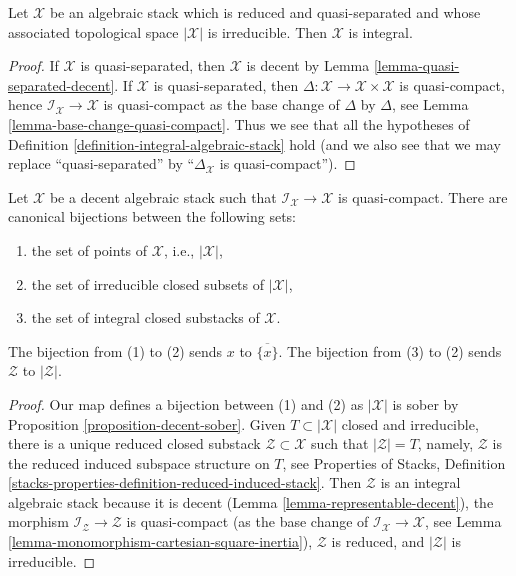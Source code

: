 \begin{lemma}
\label{lemma-totaro-case}
Let $\mathcal{X}$ be an algebraic stack which is reduced and quasi-separated
and whose associated topological space $|\mathcal{X}|$ is irreducible.
Then $\mathcal{X}$ is integral.
\end{lemma}

\begin{proof}
If $\mathcal{X}$ is quasi-separated, then $\mathcal{X}$ is decent
by Lemma \ref{lemma-quasi-separated-decent}.
If $\mathcal{X}$ is quasi-separated, then
$\Delta : \mathcal{X} \to \mathcal{X} \times \mathcal{X}$ is quasi-compact,
hence $\mathcal{I}_\mathcal{X} \to \mathcal{X}$ is quasi-compact
as the base change of $\Delta$ by $\Delta$, see
Lemma \ref{lemma-base-change-quasi-compact}.
Thus we see that all the hypotheses of
Definition \ref{definition-integral-algebraic-stack} hold
(and we also see that we may replace ``quasi-separated'' by
``$\Delta_\mathcal{X}$ is quasi-compact'').
\end{proof}

\begin{lemma}
\label{lemma-decent-irreducible-closed}
Let $\mathcal{X}$ be a decent algebraic stack such that
$\mathcal{I}_\mathcal{X} \to \mathcal{X}$ is quasi-compact.
There are canonical bijections between the following sets:
\begin{enumerate}
\item the set of points of $\mathcal{X}$, i.e., $|\mathcal{X}|$,
\item the set of irreducible closed subsets of $|\mathcal{X}|$,
\item the set of integral closed substacks of $\mathcal{X}$.
\end{enumerate}
The bijection from (1) to (2) sends $x$ to $\overline{\{x\}}$.
The bijection from (3) to (2) sends $\mathcal{Z}$ to $|\mathcal{Z}|$.
\end{lemma}

\begin{proof}
Our map defines a bijection between (1) and (2) as $|\mathcal{X}|$ is
sober by  Proposition \ref{proposition-decent-sober}.
Given $T \subset |\mathcal{X}|$ closed and irreducible, there is a
unique reduced closed substack $\mathcal{Z} \subset \mathcal{X}$
such that $|\mathcal{Z}| = T$, namely, $\mathcal{Z}$
is the reduced induced subspace structure on $T$, see
Properties of Stacks, Definition
\ref{stacks-properties-definition-reduced-induced-stack}.
Then $\mathcal{Z}$ is an integral algebraic stack because it is
decent (Lemma \ref{lemma-representable-decent}), the
morphism $\mathcal{I}_\mathcal{Z} \to \mathcal{Z}$ is quasi-compact
(as the base change of $\mathcal{I}_\mathcal{X} \to \mathcal{X}$, see
Lemma \ref{lemma-monomorphism-cartesian-square-inertia}),
$\mathcal{Z}$ is reduced, and $|\mathcal{Z}|$ is irreducible.
\end{proof}










